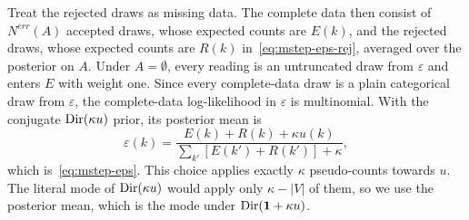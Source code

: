 Treat the rejected draws as missing data. The complete data then consist of $N^{\textit{err}}(A)$ accepted draws, whose expected counts are $E(k)$, and the rejected draws, whose expected counts are $R(k)$ in~\eqref{eq:mstep-eps-rej}, averaged over the posterior on $A$. Under $A=\emptyset$, every reading is an untruncated draw from $\varepsilon$ and enters $E$ with weight one. Since every complete-data draw is a plain categorical draw from $\varepsilon$, the complete-data log-likelihood in $\varepsilon$ is multinomial. With the conjugate $\mathrm{Dir}(\kappa u)$ prior, its posterior mean is
\[
\varepsilon(k)=\frac{E(k)+R(k)+\kappa u(k)}{\sum_{k'}[E(k')+R(k')]+\kappa},
\]
which is~\eqref{eq:mstep-eps}. This choice applies exactly $\kappa$ pseudo-counts towards $u$. The literal mode of $\mathrm{Dir}(\kappa u)$ would apply only $\kappa-|V|$ of them, so we use the posterior mean, which is the mode under $\mathrm{Dir}(\mathbf{1}+\kappa u)$.
